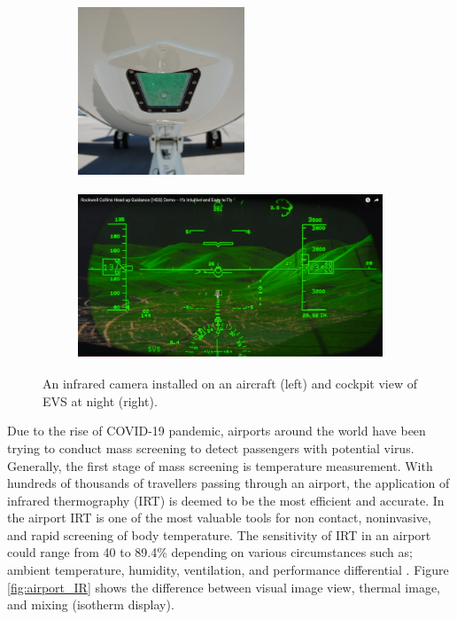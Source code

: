 \begin{figure}[!ht]
\begin{center}
%    
  \begin{subfigure}[b]{0.4\textwidth}
    \includegraphics[height=5cm]{Figures/IR_IR camera install.jpg}
  \end{subfigure}
  \begin{subfigure}[b]{0.5\textwidth}
    \includegraphics[height=5cm]{Figures/IR_EVS view.png}
  \end{subfigure}
%  
  \caption{An infrared camera installed on an aircraft \cite{AnonymousEnhancedWikipedia} (left) and cockpit view of EVS at night \cite{FehrmBjornsAnalysis} (right).}
    \label{fig:EVS system}
\end{center}
\end{figure}

\noindent Due to the rise of COVID-19 pandemic, airports around the world have been trying to conduct mass screening to detect passengers with potential virus. Generally, the first stage of mass screening is temperature measurement. With hundreds of thousands of travellers passing through an airport, the application of infrared thermography (IRT) is deemed to be the most efficient and accurate. In the airport IRT is one of the most valuable tools for non contact, noninvasive, and rapid screening of body temperature.  The sensitivity of IRT in an airport could range from 40 to 89.4\% depending on various circumstances such as; ambient temperature, humidity, ventilation, and performance differential \cite{Sun2017ApplicationsStations}. Figure \ref{fig:airport_IR} shows the difference between visual image view, thermal image, and mixing (isotherm display).\\

